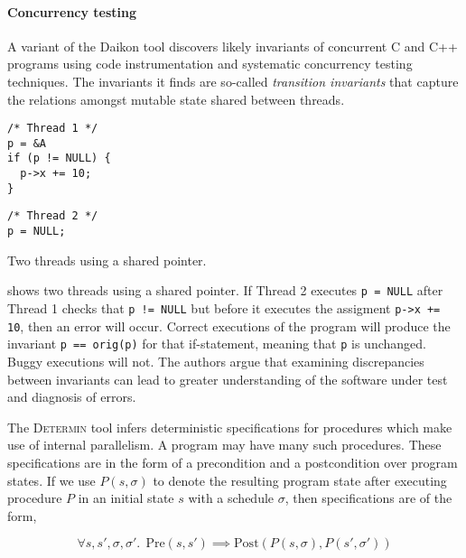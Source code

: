\paragraph{Concurrency testing}
A variant of the Daikon tool discovers likely invariants of concurrent
C and C++ programs using code instrumentation and systematic
concurrency testing techniques\cite{kusano2015}.  The invariants it
finds are so-called \emph{transition invariants} that capture the
relations amongst mutable state shared between threads.

\begin{listing}
\centering
\begin{minipage}[t]{0.3\textwidth}
\begin{verbatim}
/* Thread 1 */
p = &A
if (p != NULL) {
  p->x += 10;
}
\end{verbatim}
\end{minipage}
\begin{minipage}[t]{0.3\textwidth}
\begin{verbatim}
/* Thread 2 */
p = NULL;
\end{verbatim}
\end{minipage}
\caption{Two threads using a shared pointer.}\label{lst:cthreads}
\end{listing}

 shows two threads using a shared pointer.  If
Thread 2 executes \verb|p = NULL| after Thread 1 checks that
\verb|p != NULL| but before it executes the assigment
\verb|p->x += 10|, then an error will occur.  Correct executions of
the program will produce the invariant \verb|p == orig(p)| for that
if-statement, meaning that \verb|p| is unchanged.  Buggy executions
will not.  The authors argue that examining discrepancies between
invariants can lead to greater understanding of the software under
test and diagnosis of errors.

The \textsc{Determin} tool\cite{burnim2010} infers deterministic
specifications for procedures which make use of internal parallelism.
A program may have many such procedures.  These specifications are in
the form of a precondition and a postcondition over program states.
If we use $P(s, \sigma)$ to denote the resulting program state after
executing procedure $P$ in an initial state $s$ with a schedule
$\sigma$, then specifications are of the form,

\[
\forall s, s', \sigma, \sigma'.~~
\mathrm{Pre}\left(s, s'\right) \implies
\mathrm{Post}\left(P\left(s,\sigma\right),P\left(s', \sigma'\right)\right)
\]

